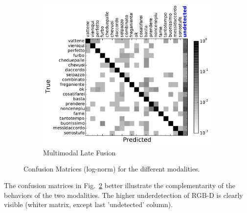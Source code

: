 \begin{figure}[t]
        ~ %
        \begin{subfigure}[c]{0.36\textwidth}
                \includegraphics[width=\textwidth]{images/cm/cm_combination}
\vspace*{-3mm}
                \caption{Multimodal Late Fusion}
                \label{fusion_cm}
        \end{subfigure}

  \caption{Confusion Matrices (log-norm)  for the different modalities.}
\label{fig:confusion_matrix}
\end{figure}

%
The confusion matrices in Fig.~\ref{fig:confusion_matrix} better illustrate the complementarity of the behaviors of the two modalities.
%
The higher underdetection of RGB-D is clearly visible (whiter matrix, except last 'undetected' column).
%


